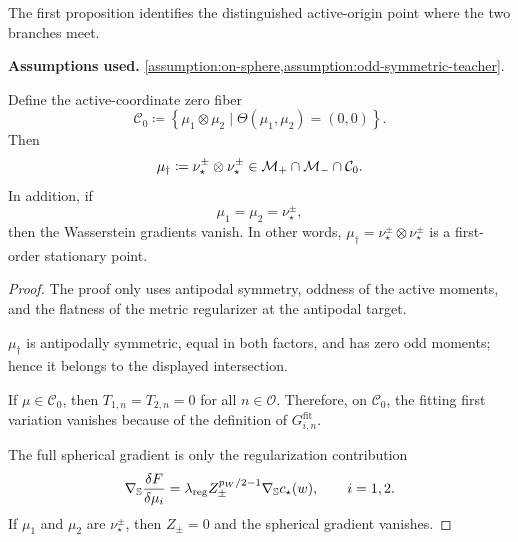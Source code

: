 The first proposition identifies the distinguished active-origin point where the two branches meet.
\begin{proposition}
\label{prop:intersection-zero-output-fiber}
\textbf{Assumptions used.} \cref{assumption:on-sphere,assumption:odd-symmetric-teacher}.

Define the active-coordinate zero fiber
\begin{equation}
    \mathcal C_0
    \coloneq
    \left\{
        \mu_1\otimes \mu_2
        \mid
        \Theta(\mu_1,\mu_2)=(0,0)
    \right\}.
\end{equation}
Then
\begin{equation}
    \mu_{\dag}
    \coloneq
    \nu_\star^\pm \otimes \nu_\star^\pm
    \in
    \mathcal M_+\cap\mathcal{M}_{-}\cap\mathcal C_0.
\end{equation}
In addition, if
\begin{equation}
    \mu_1=\mu_2=\nu_\star^\pm,
\end{equation}
then the Wasserstein gradients vanish. In other words,
$\mu_{\dag}=\nu_\star^\pm\otimes\nu_\star^\pm$ is a first-order stationary point.
\end{proposition}

\begin{proof}
The proof only uses antipodal symmetry, oddness of the active moments, and the flatness of the metric regularizer at the antipodal target.

$\mu_\dag$ is antipodally symmetric, equal in both factors, and has zero odd moments; hence it belongs to the displayed intersection.

If $\mu\in\mathcal C_0$, then $T_{1,n}=T_{2,n}=0$ for all $n\in\mathcal O$. Therefore, on $\mathcal C_0$, the fitting first variation vanishes because of the definition of $G_{i,n}^{\mathrm{fit}}$.

The full spherical gradient is only the regularization contribution
\begin{equation}
    \nabla_{\mathbb{S}}\frac{\delta F}{\delta \mu_i}
    =
    \lambda_{\mathrm{reg}} Z_{\pm}^{p_W/2-1} \nabla_{\mathbb{S}} c_\star (w),
    \qquad i=1,2.
\end{equation}
If $\mu_1$ and $\mu_2$ are $\nu_\star^{\pm}$, then $Z_{\pm}=0$ and the spherical gradient vanishes.
\end{proof}

